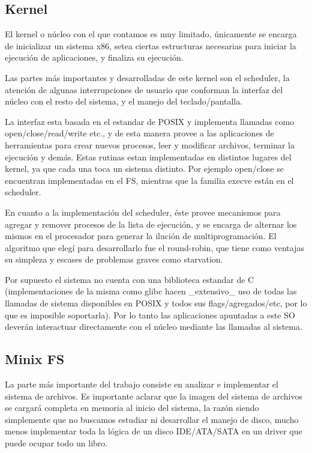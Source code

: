 \subsection{Kernel}

El kernel o núcleo con el que contamos es muy limitado, únicamente se encarga de
inicializar un sistema x86, setea ciertas estructuras necesarias para iniciar la
ejecución de aplicaciones, y finaliza su ejecución.

Las partes más importantes y desarrolladas de este kernel son el scheduler, la
atención de algunas interrupciones de usuario que conforman la interfaz del
núcleo con el resto del sistema, y el manejo del teclado/pantalla.

La interfaz esta basada en el estandar de POSIX y implementa llamadas como
open/close/read/write etc., y de esta manera provee a las aplicaciones de
herramientas para crear nuevos procesos, leer y modificar archivos, terminar
la ejecución y demás. Estas rutinas estan implementadas en distintos lugares
del kernel, ya que cada una toca un sistema distinto. Por ejemplo open/close
se encuentran implementadas en el FS, mientras que la familia execve están en
el scheduler.

En cuanto a la implementación del scheduler, éste provee mecanismos para agregar
y remover procesos de la lista de ejecución, y se encarga de alternar los mismos
en el procesador para generar la ilución de multiprogramación. El algoritmo que
elegí para desarrollarlo fue el round-robin, que tiene como ventajas su simpleza
y escases de problemas graves como starvation.

Por supuesto el sistema no cuenta con una biblioteca estandar de C
(implementaciones de la misma como glibc hacen \_extensivo\_ uso de todas las
llamadas de sistema disponibles en POSIX y todos sus flags/agregados/etc, por lo
que es imposible soportarla). Por lo tanto las aplicaciones apuntadas a este SO
deverán interactuar directamente con el núcleo mediante las llamadas al sistema.

\subsection{Minix FS}

La parte más importante del trabajo consiste en analizar e implementar el
sistema de archivos. Es importante aclarar que la imagen del sistema de archivos
se cargará completa en memoria al inicio del sistema, la razón siendo
simplemente que no buscamos estudiar ni desarrollar el manejo de disco, mucho
menos implementar toda la lógica de un disco IDE/ATA/SATA en un driver que puede
ocupar todo un libro.

